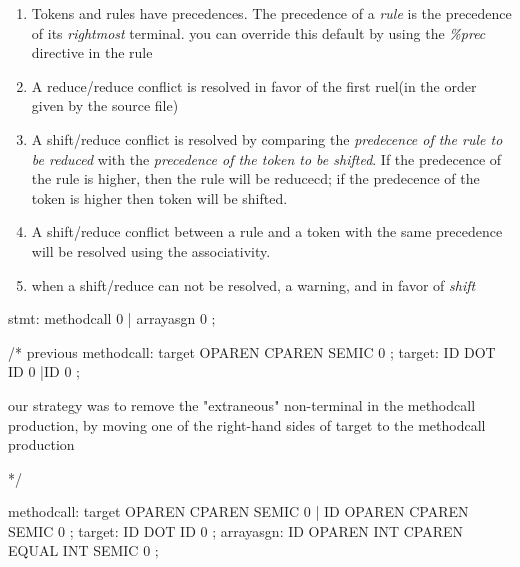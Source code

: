 \begin{enumerate}
        \begin{enumerate}
        \item Tokens and rules have precedences. The precedence of a
          \textit{rule} is the precedence of its \textit{rightmost}
          terminal. you can override this default by using the
          \textit{\%prec} directive in the rule
        \item A reduce/reduce conflict is resolved in favor of the
          first ruel(in the order given by the source file)
        \item A shift/reduce conflict is resolved by comparing the
          \textit{predecence of the rule to be reduced} with the \textit{precedence of
          the token to be shifted}. If the predecence of the rule is
          higher, then the rule will be reducecd; if the predecence of
          the token is higher then token will be shifted.
        \item A shift/reduce conflict between a rule and a token with
          the same precedence will be resolved using the
          associativity.
        \item when a shift/reduce can not be resolved, a warning, and
          in favor of \textit{shift}
        \end{enumerate}
        \begin{bluecode}





stmt: methodcall {0} | arrayasgn {0}
; 

/*
previous 
methodcall: target OPAREN CPAREN SEMIC {0}
; 
target:  ID DOT ID {0} |ID {0}
;

our strategy was to remove the "extraneous" non-terminal in the 
methodcall production, by moving one of the right-hand sides of target 
to the methodcall production 

*/

methodcall: target OPAREN CPAREN SEMIC {0} | ID OPAREN CPAREN SEMIC {0}
; 
target:  ID DOT ID {0}
;
arrayasgn: ID OPAREN  INT CPAREN EQUAL INT SEMIC {0}
;


           
\end{bluecode}

\begin{bluecode}



\end{bluecode}
\end{enumerate}
